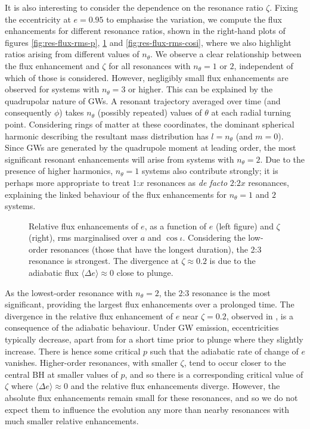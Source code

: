 It is also interesting to consider the dependence on the resonance ratio $\zeta$. Fixing the eccentricity at $e=0.95$ to emphasise the variation, we compute the flux enhancements for different resonance ratios, shown in the right-hand plots of figures \ref{fig:res-flux-rms-p}, \ref{fig:res-flux-rms-e} and \ref{fig:res-flux-rms-cosi}, where we also highlight ratios arising from different values of $n_\theta$. We observe a clear relationship between the flux enhancement and $\zeta$ for all resonances with $n_\theta = 1$ or $2$, independent of which of those is considered. However, negligibly small flux enhancements are observed for systems with $n_\theta = 3$ or higher. This can be explained by the quadrupolar nature of GWs. A resonant trajectory averaged over time (and consequently $\phi$) takes $n_\theta$ (possibly repeated) values of $\theta$ at each radial turning point. Considering rings of matter at these coordinates, the dominant spherical harmonic describing the resultant mass distribution has $l=n_\theta$ (and $m=0$). Since GWs are generated by the quadrupole moment at leading order, the most significant resonant enhancements will arise from systems with $n_\theta = 2$. Due to the presence of higher harmonics, $n_\theta = 1$ systems also contribute strongly; it is perhaps more appropriate to treat $1$:$x$ resonances as \emph{de facto} $2$:$2x$ resonances, explaining the linked behaviour of the flux enhancements for $n_\theta = 1$ and $2$ systems.

\begin{figure}[htbp]
\centering
{}
\caption{\label{fig:res-flux-rms-e}Relative flux enhancements of $e$, as a function of $e$ (left figure) and $\zeta$ (right), rms marginalised over $a$ and $\cos\iota$. Considering the low-order resonances (those that have the longest duration), the 2:3 resonance is strongest. The divergence at $\zeta \approx 0.2$ is due to the adiabatic flux $\langle\Delta e\rangle \approx 0$ close to plunge.}
\end{figure}

As the lowest-order resonance with $n_\theta = 2$, the 2:3 resonance is the most significant, providing the largest flux enhancements over a prolonged time. The divergence in the relative flux enhancement of $e$ near $\zeta = 0.2$, observed in , is a consequence of the adiabatic behaviour. Under GW emission, eccentricities typically decrease, apart from for a short time prior to plunge where they slightly increase. There is hence some critical $p$ such that the adiabatic rate of change of $e$ vanishes. Higher-order resonances, with smaller $\zeta$, tend to occur closer to the central BH at smaller values of $p$, and so there is a corresponding critical value of $\zeta$ where $\langle\Delta e\rangle \approx 0$ and the relative flux enhancements diverge. However, the absolute flux enhancements remain small for these resonances, and so we do not expect them to influence the evolution any more than nearby resonances with much smaller relative enhancements.%


